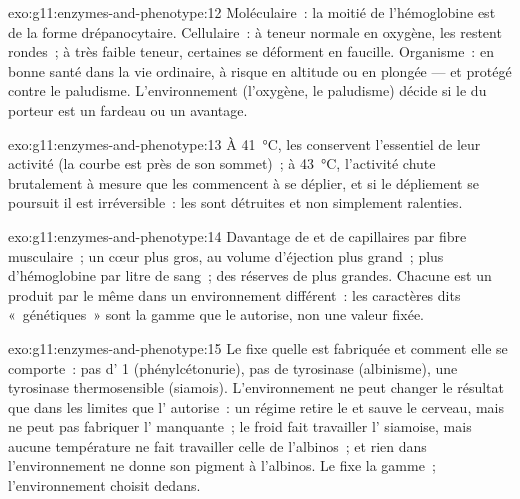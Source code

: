 \begin{solution}{exo:g11:enzymes-and-phenotype:12}
Moléculaire~: la moitié de l'hémoglobine est de la forme
drépanocytaire. Cellulaire~: à teneur normale en oxygène, les 
restent rondes~; à très faible teneur, certaines se déforment en
faucille. Organisme~: en bonne santé dans la vie ordinaire, à risque en
altitude ou en plongée --- et protégé contre le paludisme.
L'environnement (l'oxygène, le paludisme) décide si le  du
porteur est un fardeau ou un avantage.
\end{solution}

\begin{solution}{exo:g11:enzymes-and-phenotype:13}
À \qty{41}{\celsius}, les  conservent l'essentiel de leur
activité (la courbe est près de son sommet)~; à \qty{43}{\celsius},
l'activité chute brutalement à mesure que les  commencent à se
déplier, et si le dépliement se poursuit il est irréversible~: les
 sont détruites et non simplement ralenties.
\end{solution}

\begin{solution}{exo:g11:enzymes-and-phenotype:14}
Davantage de  et de capillaires par fibre musculaire~; un
cœur plus gros, au volume d'éjection plus grand~; plus d'hémoglobine
par litre de sang~; des réserves de  plus grandes. Chacune est
un  produit par le même  dans un environnement
différent~: les caractères dits «~génétiques~» sont la gamme que le
 autorise, non une valeur fixée.
\end{solution}

\begin{solution}{exo:g11:enzymes-and-phenotype:15}
Le  fixe quelle  est fabriquée et comment elle se
comporte~: pas d' 1 (phénylcétonurie), pas de tyrosinase
(albinisme), une tyrosinase thermosensible (siamois). L'environnement
ne peut changer le résultat que dans les limites que l' autorise~:
un régime retire le  et sauve le cerveau, mais ne peut pas
fabriquer l' manquante~; le froid fait travailler l'
siamoise, mais aucune température ne fait travailler celle de
l'albinos~; et rien dans l'environnement ne donne son pigment à
l'albinos. Le  fixe la gamme~; l'environnement choisit dedans.
\end{solution}

